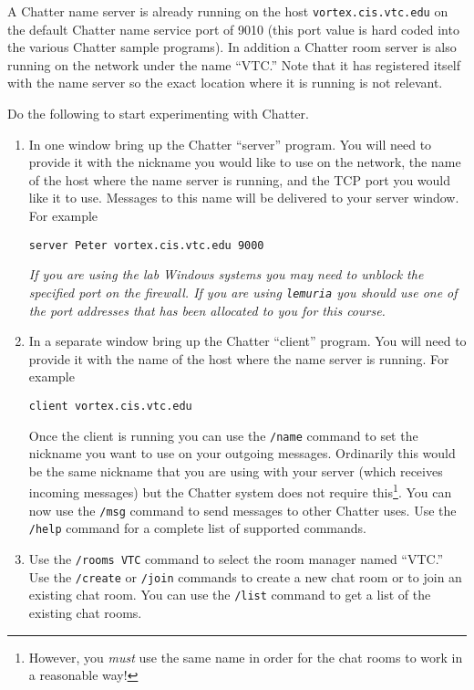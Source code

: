 \documentclass[twocolumn]{article}
\begin{document}
A Chatter name server is already running on the host \texttt{vortex.cis.vtc.edu} on the default
Chatter name service port of 9010 (this port value is hard coded into the various Chatter sample
programs). In addition a Chatter room server is also running on the network under the name
``VTC.'' Note that it has registered itself with the name server so the exact location where it
is running is not relevant.

Do the following to start experimenting with Chatter.

\begin{enumerate}

\item In one window bring up the Chatter ``server'' program. You will need to provide it with
  the nickname you would like to use on the network, the name of the host where the name server
  is running, and the TCP port you would like it to use. Messages to this name will be delivered
  to your server window. For example
\begin{verbatim}
server Peter vortex.cis.vtc.edu 9000
\end{verbatim}

  \emph{If you are using the lab Windows systems you may need to unblock the specified port on
    the firewall. If you are using \texttt{lemuria} you should use one of the port addresses
    that has been allocated to you for this course.}

\item In a separate window bring up the Chatter ``client'' program. You will need to provide it
  with the name of the host where the name server is running. For example
\begin{verbatim}
client vortex.cis.vtc.edu
\end{verbatim}

  Once the client is running you can use the \texttt{/name} command to set the nickname you want
  to use on your outgoing messages. Ordinarily this would be the same nickname that you are
  using with your server (which receives incoming messages) but the Chatter system does not
  require this\footnote{However, you \emph{must} use the same name in order for the chat rooms
    to work in a reasonable way!}. You can now use the \texttt{/msg} command to send messages to
  other Chatter uses. Use the \texttt{/help} command for a complete list of supported commands.

\item Use the \texttt{/rooms VTC} command to select the room manager named ``VTC.'' Use the
  \texttt{/create} or \texttt{/join} commands to create a new chat room or to join an existing
  chat room. You can use the \texttt{/list} command to get a list of the existing chat rooms.

\end{enumerate}
\end{document}
